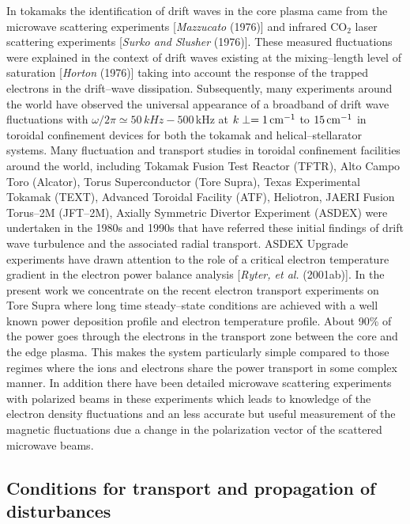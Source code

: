 \documentclass[a4paper,openany,12pt]{book}
\begin{document}
In tokamaks the identification of drift waves in the core plasma came from the microwave scattering experiments [{\it Mazzucato} (1976)] and infrared CO$_2$ laser scattering experiments [\emph{Surko and Slusher} (1976)]. These measured fluctuations were explained in the context of drift waves existing at the mixing--length level of saturation [\emph{Horton} (1976)] taking into account the response of the trapped electrons in the drift--wave dissipation. Subsequently, many experiments around the world have observed the universal appearance of a broadband of drift wave fluctuations with $\omega/2\pi\simeq 50\,kHz-500\,$kHz at $k\perp=1\,\rm cm^{-1}$ to $15\,\rm cm^{-1}$ in toroidal confinement devices for both the tokamak and helical--stellarator systems. Many fluctuation and transport studies in toroidal confinement facilities around the world, including Tokamak Fusion Test Reactor (TFTR), Alto Campo Toro (Alcator), Torus Superconductor (Tore Supra), Texas Experimental Tokamak (TEXT), Advanced Toroidal Facility (ATF), Heliotron, JAERI Fusion Torus--2M (JFT--2M), Axially Symmetric Divertor Experiment (ASDEX) were undertaken in the 1980s and 1990s that have referred these initial findings of drift wave turbulence and the associated radial transport. ASDEX Upgrade experiments have drawn attention to the role of a critical electron temperature gradient in the electron power balance analysis [\emph{Ryter, et al.} (2001ab)]. In the present work we concentrate on the recent electron transport experiments on Tore Supra where long time steady--state conditions are achieved with a well known power deposition profile and electron temperature profile. About 90\% of the power goes through the electrons in the transport zone between the core and the edge plasma. This makes the system particularly simple compared to those regimes where the ions and electrons share the power transport in some complex manner. In addition there have been detailed microwave scattering experiments with polarized beams in these experiments which leads to knowledge of the electron density fluctuations and an less accurate but useful measurement of the magnetic fluctuations due a change in the polarization vector of the scattered microwave beams.

\subsection{Conditions for transport and propagation of disturbances}
\end{document}
